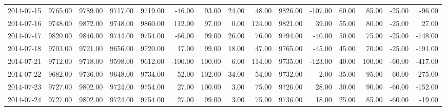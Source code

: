 \documentclass{article}
\begin{document}
\begin{table}[ht]
\begin{tabular}{lrrrrrrrrrrrrrr}
  2014-07-15 & 9765.00 & 9789.00 & 9717.00 & 9719.00 & -46.00 & 93.00 & 24.00 & 48.00 & 9826.00 & -107.00 & 60.00 & 85.00 & -25.00 & -96.00 \\ 
  2014-07-16 & 9748.00 & 9872.00 & 9748.00 & 9860.00 & 112.00 & 97.00 & 0.00 & 124.00 & 9821.00 & 39.00 & 55.00 & 80.00 & -25.00 & 27.00 \\ 
  2014-07-17 & 9820.00 & 9846.00 & 9744.00 & 9754.00 & -66.00 & 99.00 & 26.00 & 76.00 & 9794.00 & -40.00 & 50.00 & 75.00 & -25.00 & -148.00 \\ 
  2014-07-18 & 9703.00 & 9721.00 & 9656.00 & 9720.00 & 17.00 & 99.00 & 18.00 & 47.00 & 9765.00 & -45.00 & 45.00 & 70.00 & -25.00 & -191.00 \\ 
  2014-07-21 & 9712.00 & 9718.00 & 9598.00 & 9612.00 & -100.00 & 100.00 & 6.00 & 114.00 & 9735.00 & -123.00 & 40.00 & 100.00 & -60.00 & -417.00 \\ 
  2014-07-22 & 9682.00 & 9736.00 & 9648.00 & 9734.00 & 52.00 & 102.00 & 34.00 & 54.00 & 9732.00 & 2.00 & 35.00 & 95.00 & -60.00 & -275.00 \\ 
  2014-07-23 & 9727.00 & 9802.00 & 9724.00 & 9754.00 & 27.00 & 100.00 & 3.00 & 75.00 & 9726.00 & 28.00 & 30.00 & 90.00 & -60.00 & -152.00 \\ 
  2014-07-24 & 9727.00 & 9802.00 & 9724.00 & 9754.00 & 27.00 & 99.00 & 3.00 & 75.00 & 9736.00 & 18.00 & 25.00 & 85.00 & -60.00 & -19.00 \\ 
   \hline
\end{tabular}
\end{table}
\end{document}
